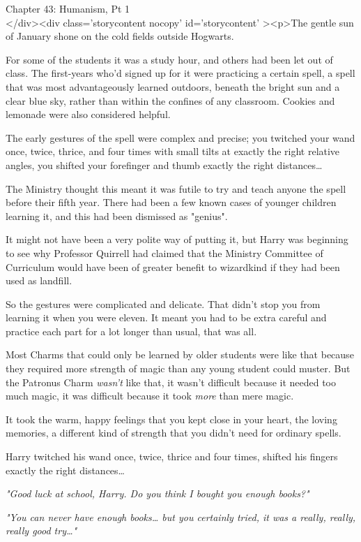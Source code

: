 
Chapter 43: Humanism, Pt 1\\
</div><div  class='storycontent nocopy' id='storycontent' ><p>The gentle sun of 
January shone on the cold fields outside Hogwarts.

For some of the students it was a study hour, and others had been let out of 
class. The first-years who'd signed up for it were practicing a certain spell, 
a spell that was most advantageously learned outdoors, beneath the bright sun 
and a clear blue sky, rather than within the confines of any classroom. Cookies 
and lemonade were also considered helpful.

The early gestures of the spell were complex and precise; you twitched your 
wand once, twice, thrice, and four times with small tilts at exactly the right 
relative angles, you shifted your forefinger and thumb exactly the right 
distances{\ldots}

The Ministry thought this meant it was futile to try and teach anyone the spell 
before their fifth year. There had been a few known cases of younger children 
learning it, and this had been dismissed as "genius".

It might not have been a very polite way of putting it, but Harry was beginning 
to see why Professor Quirrell had claimed that the Ministry Committee of 
Curriculum would have been of greater benefit to wizardkind if they had been 
used as landfill.

So the gestures were complicated and delicate. That didn't stop you from 
learning it when you were eleven. It meant you had to be extra careful and 
practice each part for a lot longer than usual, that was all.

Most Charms that could only be learned by older students were like that because 
they required more strength of magic than any young student could muster. But 
the Patronus Charm \emph{wasn't} like that, it wasn't difficult because it 
needed too much magic, it was difficult because it took \emph{more} than mere 
magic.

It took the warm, happy feelings that you kept close in your heart, the loving 
memories, a different kind of strength that you didn't need for ordinary spells.

Harry twitched his wand once, twice, thrice and four times, shifted his fingers 
exactly the right distances{\ldots}

\emph{"Good luck at school, Harry. Do you think I bought you enough books?"}

\emph{"You can never have enough books{\ldots} but you certainly tried, it was 
a really, really, really good try{\ldots}"}

